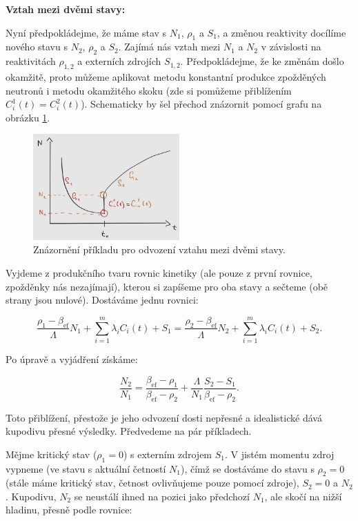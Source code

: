 \textbf{Vztah mezi dvěmi stavy:}

Nyní předpokládejme, že máme stav s $N_1$, $\rho_1$ a $S_1$, a změnou reaktivity docílíme nového stavu s $N_2$, $\rho_2$ a $S_2$. Zajímá nás vztah mezi $N_1$ a $N_2$ v závislosti na reaktivitách $\rho_{1,2}$ a externích zdrojích $S_{1,2}$. Předpokládejme, že ke změnám došlo okamžitě, proto můžeme aplikovat metodu konstantní produkce zpožděných neutronů i metodu okamžitého skoku (zde si pomůžeme přiblížením $C_i^1(t) = C_i^2(t)$). Schematicky by šel přechod znázornit pomocí grafu na obrázku \ref{fig_podil_N_ukazka}.

\begin{figure}[H]
  \centering
  \includegraphics[width=0.5\textwidth]{img/podil_N_ukazka.jpg}
  \caption{Znázornění příkladu pro odvození vztahu mezi dvěmi stavy.}
  \label{fig_podil_N_ukazka}
\end{figure}

Vyjdeme z produkčního tvaru rovnic kinetiky (ale pouze z první rovnice, zpožděnky nás nezajímají), kterou si zapíšeme pro oba stavy a sečteme (obě strany jsou nulové). Dostáváme jednu rovnici:

$$ \dfrac{\rho_1 - \beta_{\text{ef}}}{\Lambda} N_1 + \sum_{i=1}^m \lambda_i C_i(t) + S_1 = \dfrac{\rho_2 - \beta_{\text{ef}}}{\Lambda} N_2 + \sum_{i=1}^m \lambda_i C_i(t) + S_2. $$

Po úpravě a vyjádření získáme:

$$ \dfrac{N_2}{N_1} = \dfrac{\beta_{\text{ef}} - \rho_1}{\beta_{\text{ef}} - \rho_2} + \dfrac{\Lambda}{N_1} \dfrac{S_2 - S_1}{\beta_{\text{ef}} - \rho_2}. $$

Toto přiblížení, přestože je jeho odvození dosti nepřesné a idealistické dává kupodivu přesné výsledky. Předvedeme na pár příkladech.

Mějme kritický stav ($\rho_1 = 0$) s externím zdrojem $S_1$. V jistém momentu zdroj vypneme (ve stavu s aktuální četností $N_1$), čímž se dostáváme do stavu s $\rho_2 = 0$ (stále máme kritický stav, četnost ovlivňujeme pouze pomocí zdroje), $S_2 = 0$ a $N_2$. Kupodivu, $N_2$ se neustálí ihned na pozici jako předchozí $N_1$, ale skočí na nižší hladinu, přesně podle rovnice:

